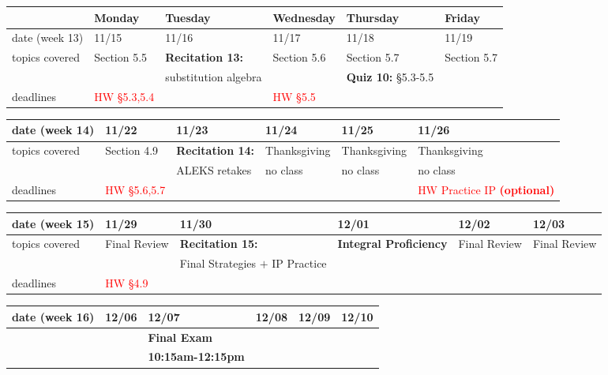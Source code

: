 \documentclass[11pt,fleqn]{article}
\begin{document}
\begin{tabularx}{\textwidth}{|X|| X | X | X | X | X |}
\hline
&Monday & Tuesday & Wednesday & Thursday & Friday \\
\hline 
\hline
\rowcolor{gray!20}
date (week 13)&11/15&11/16&11/17&11/18&11/19\\ \hline
topics covered&Section 5.5&\textbf{Recitation 13:}&Section 5.6&Section 5.7&Section 5.7\\ 
&&substitution algebra&&\textbf{Quiz 10:} \S5.3-5.5&\\ \hline
deadlines&\textcolor{red}{HW \S 5.3,5.4}&&\textcolor{red}{HW \S 5.5}&& \\  \hline
\end{tabularx}
\vfill
\begin{tabularx}{\textwidth}{|X|| X | X | X | X | X |}
\hline
\rowcolor{gray!20}
date (week 14)&11/22&11/23&11/24&11/25&11/26\\ \hline
topics covered&Section 4.9&\textbf{Recitation 14:}&Thanksgiving&Thanksgiving&Thanksgiving\\ 
&&ALEKS retakes&no class&no class&no class\\ \hline
deadlines&\textcolor{red}{HW \S 5.6,5.7}&&&&\textcolor{red}{HW Practice IP \textbf{(optional)}}\\ \hline 
\end{tabularx}
\vfill
\begin{tabularx}{\textwidth}{|X|| X | X | X | X | X |}
\hline
\rowcolor{gray!20}
date (week 15)&11/29&11/30&12/01&12/02&12/03\\ \hline
topics covered&Final Review&\textbf{Recitation 15:}&\textcolor{dcyan}{\textbf{Integral Proficiency}}&Final Review&Final Review\\ 
&&Final Strategies $+$ IP Practice&&&\\ 
\hline
deadlines&\textcolor{red}{HW \S4.9}&&&& \\ \hline 
\end{tabularx}
\vfill
\begin{tabularx}{\textwidth}{|X|| X | X | X | X | X |}
\hline
\rowcolor{gray!20}
date (week 16)&12/06&12/07&12/08&12/09&12/10\\ \hline
&&\textcolor{dcyan}{\textbf{Final Exam}}&&&\\ 
&&\textcolor{dcyan}{\textbf{10:15am-12:15pm}}&&&\\ \hline
\end{tabularx}
\vfill

\quad

\vspace{3in}

\quad
\end{document}
